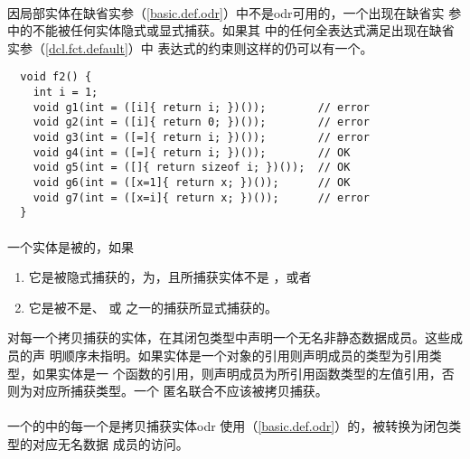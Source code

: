 \newpage

\paragraph{} %
\begin{note}
  因局部实体在缺省实参（\ref{basic.def.odr}）中不是odr可用的，一个出现在缺省实
  参中的不能被任何实体隐式或显式捕获。如果其
  中的任何全表达式满足出现在缺省实参（\ref{dcl.fct.default}）中
  表达式的约束则这样的仍可以有一个。
\end{note}

\begin{example}
  \begin{lstlisting}
  void f2() {
    int i = 1;
    void g1(int = ([i]{ return i; })());        // error
    void g2(int = ([i]{ return 0; })());        // error
    void g3(int = ([=]{ return i; })());        // error
    void g4(int = ([=]{ return i; })());        // OK
    void g5(int = ([]{ return sizeof i; })());  // OK
    void g6(int = ([x=1]{ return x; })());      // OK
    void g7(int = ([x=i]{ return x; })());      // error
  }
  \end{lstlisting}
\end{example}

\paragraph{} %
一个实体是被的，如果
\begin{enumerate}
  \item 它是被隐式捕获的，为\tm{=}，且所捕获实体不是
        ，或者
  \item 它是被不是、\tm{\&} 或
        \tm{\&} 之一的捕获所显式捕获的。
\end{enumerate}

对每一个拷贝捕获的实体，在其闭包类型中声明一个无名非静态数据成员。这些成员的声
明顺序未指明。如果实体是一个对象的引用则声明成员的类型为引用类型，如果实体是一
个函数的引用，则声明成员为所引用函数类型的左值引用，否则为对应所捕获类型。一个
匿名联合不应该被拷贝捕获。

\paragraph{} %
一个的中的每一个是拷贝捕获实体odr
使用（\ref{basic.def.odr}）的，被转换为闭包类型的对应无名数据
成员的访问。

